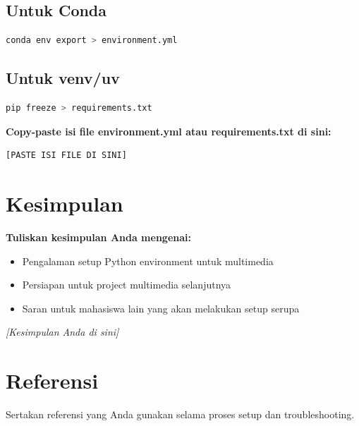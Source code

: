 \documentclass[11pt,a4paper]{article}
\begin{document}
\subsection{Untuk Conda}
\begin{lstlisting}[language=bash, caption=Export conda environment]
conda env export > environment.yml
\end{lstlisting}

\subsection{Untuk venv/uv}
\begin{lstlisting}[language=bash, caption=Export pip requirements]
pip freeze > requirements.txt
\end{lstlisting}

\textbf{Copy-paste isi file environment.yml atau requirements.txt di sini:}

\begin{lstlisting}[caption=Environment/Requirements file]
[PASTE ISI FILE DI SINI]
\end{lstlisting}

\section{Kesimpulan}
\textbf{Tuliskan kesimpulan Anda mengenai:}
\begin{itemize}
    \item Pengalaman setup Python environment untuk multimedia
    \item Persiapan untuk project multimedia selanjutnya
    \item Saran untuk mahasiswa lain yang akan melakukan setup serupa
\end{itemize}

\textit{[Kesimpulan Anda di sini]}

\section{Referensi}
Sertakan referensi yang Anda gunakan selama proses setup dan troubleshooting.

\newpage


\end{document}

